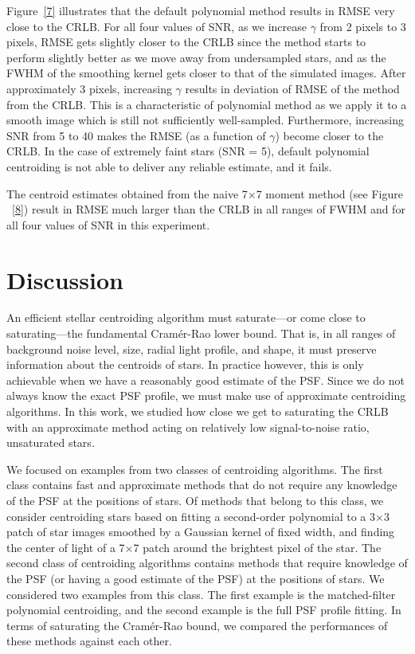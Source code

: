 \documentclass[12pt, preprint]{aastex}
\begin{document}
Figure~\ref{7} illustrates that the default polynomial method results in RMSE very close to the CRLB.
For all four values of SNR, as we increase $\gamma$ from 2 pixels to 3 pixels,
RMSE gets slightly closer to the CRLB since the method starts to perform
slightly better as we move away from undersampled stars, and as the FWHM of the smoothing kernel
gets closer to that of the simulated images.
After approximately 3 pixels, increasing $\gamma$ results in deviation of RMSE of the method from the CRLB.
This is a characteristic of polynomial method as we apply it to a smooth image which is still not sufficiently
well-sampled.  Furthermore, increasing SNR from 5 to 40 makes the RMSE (as a function of $\gamma$) become
closer to the CRLB. In the case of extremely faint stars (SNR = 5),
default polynomial centroiding is not able to deliver any reliable estimate, and it fails.

The centroid estimates obtained from the naive 7$\times$7 moment method (see Figure ~\ref{8})
result in RMSE much larger than the CRLB in all ranges of FWHM and for all four
values of SNR in this experiment. 

\section{Discussion}\label{sec:discussion}

An efficient stellar centroiding algorithm must saturate---or come close to saturating---the fundamental 
Cram\'{e}r-Rao lower bound. That is, in all ranges of background noise level, size, radial light profile,
and shape, it must preserve information about the centroids of stars. In practice however,
this is only achievable when we have a reasonably good estimate of the PSF. Since we do not always 
know the exact PSF profile, we must make use of approximate centroiding algorithms. In this work, we
studied how close we get to saturating the CRLB with an approximate method acting on relatively low 
signal-to-noise ratio, unsaturated stars.
 
We focused on examples from two classes of centroiding algorithms. The first class contains fast and approximate
methods that do not require any knowledge of the PSF at the positions of stars. Of methods that belong to this class,
we consider centroiding stars based on fitting a second-order
polynomial to a 3$\times$3 patch of star images smoothed by a Gaussian kernel of fixed width, and finding the center of light 
of a 7$\times$7 patch around the brightest pixel of the star.
The second class of centroiding algorithms contains methods that require knowledge of the PSF (or having a good estimate
of the PSF) at the positions of stars. We considered two examples from this class. The first example
is the matched-filter polynomial centroiding, and the
second example is the full PSF profile fitting. In terms of saturating the Cram\'{e}r-Rao bound, we compared 
the performances of these methods against each other.
\end{document}
